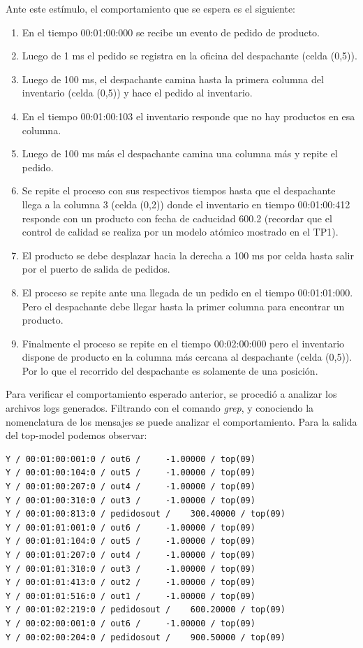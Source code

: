 \documentclass[10pt]{article}
\begin{document}
Ante este estímulo, el comportamiento que se espera es el siguiente:
\begin{enumerate}
	\item En el tiempo 00:01:00:000 se recibe un evento de pedido de producto.
	\item Luego de 1 ms el pedido se registra en la oficina del despachante (celda (0,5)).
	\item Luego de 100 ms, el despachante camina hasta la primera columna del inventario (celda (0,5)) y hace el pedido al inventario.
	\item En el tiempo 00:01:00:103 el inventario responde que no hay productos en esa columna.
	\item Luego de 100 ms más el despachante camina una columna más y repite el pedido.
	\item Se repite el proceso con sus respectivos tiempos hasta que el despachante llega a la columna 3 (celda (0,2)) donde el inventario en tiempo 00:01:00:412 responde con un producto con fecha de caducidad 600.2 (recordar que el control de calidad se realiza por un modelo atómico mostrado en el TP1).
	\item El producto se debe desplazar hacia la derecha a 100 ms por celda hasta salir por el puerto de salida de pedidos.
	\item El proceso se repite ante una llegada de un pedido en el tiempo 00:01:01:000. Pero el despachante debe llegar hasta la primer columna para encontrar un producto.
	\item Finalmente el proceso se repite en el tiempo 00:02:00:000 pero el inventario dispone de producto en la columna más cercana al despachante (celda (0,5)). Por lo que el recorrido del despachante es solamente de una posición.
\end{enumerate}

Para verificar el comportamiento esperado anterior, se procedió a analizar los archivos logs generados. Filtrando con el comando \textit{grep}, y conociendo la nomenclatura de los mensajes se puede analizar el comportamiento.
Para la salida del top-model podemos observar:

\begin{minipage}{1\textwidth}
	\centering
	\begin{lstlisting}
Y / 00:01:00:001:0 / out6 /     -1.00000 / top(09)
Y / 00:01:00:104:0 / out5 /     -1.00000 / top(09)
Y / 00:01:00:207:0 / out4 /     -1.00000 / top(09)
Y / 00:01:00:310:0 / out3 /     -1.00000 / top(09)
Y / 00:01:00:813:0 / pedidosout /    300.40000 / top(09)
Y / 00:01:01:001:0 / out6 /     -1.00000 / top(09)
Y / 00:01:01:104:0 / out5 /     -1.00000 / top(09)
Y / 00:01:01:207:0 / out4 /     -1.00000 / top(09)
Y / 00:01:01:310:0 / out3 /     -1.00000 / top(09)
Y / 00:01:01:413:0 / out2 /     -1.00000 / top(09)
Y / 00:01:01:516:0 / out1 /     -1.00000 / top(09)
Y / 00:01:02:219:0 / pedidosout /    600.20000 / top(09)
Y / 00:02:00:001:0 / out6 /     -1.00000 / top(09)
Y / 00:02:00:204:0 / pedidosout /    900.50000 / top(09)
	\end{lstlisting}	
\end{minipage}
\end{document}
